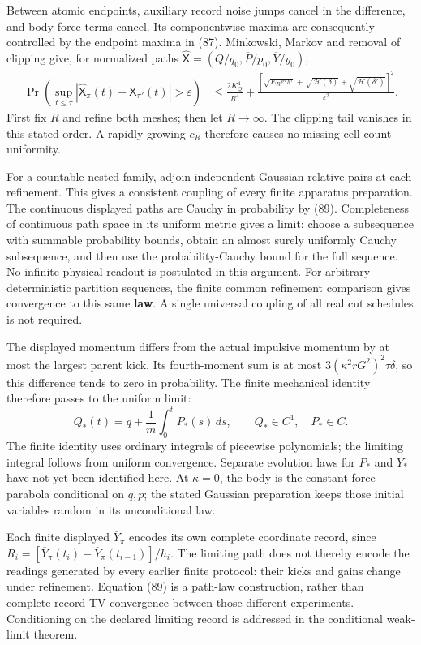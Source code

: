 \documentclass[11pt,a4paper]{article}
\begin{document}
Between atomic endpoints, auxiliary record noise jumps cancel in the
difference, and body force terms cancel. Its componentwise maxima are
consequently controlled by the endpoint maxima in (87). Minkowski,
Markov and removal of clipping give, for normalized paths
\(\widehat{\mathsf X}=(Q/q_0,\overline P/p_0,\overline Y/y_0)\),
\[\begin{aligned}
\Pr\left(\sup_{t\le\tau}
 |\widehat{\mathsf X}_\pi(t)-\widehat{\mathsf X}_{\pi'}(t)|
                    >\varepsilon\right)
&\le\frac{2K_Q^4}{R^4}
 +\frac{\left[\sqrt{E_Re^{c_R\tau}}
       +\sqrt{\mathcal H(\delta)}
       +\sqrt{\mathcal H(\delta')}\right]^2}{\varepsilon^2}.
\end{aligned}\tag{89}\] First fix \(R\) and refine both meshes; then let
\(R\to\infty\). The clipping tail vanishes in this stated order. A
rapidly growing \(c_R\) therefore causes no missing cell-count
uniformity.

For a countable nested family, adjoin independent Gaussian relative
pairs at each refinement. This gives a consistent coupling of every
finite apparatus preparation. The continuous displayed paths are Cauchy
in probability by (89). Completeness of continuous path space in its
uniform metric gives a limit: choose a subsequence with summable
probability bounds, obtain an almost surely uniformly Cauchy
subsequence, and then use the probability-Cauchy bound for the full
sequence. No infinite physical readout is postulated in this argument.
For arbitrary deterministic partition sequences, the finite common
refinement comparison gives convergence to this same \textbf{law}. A
single universal coupling of all real cut schedules is not required.

The displayed momentum differs from the actual impulsive momentum by at
most the largest parent kick. Its fourth-moment sum is at most
\(3(\kappa^2rG^2)^2\tau\delta\), so this difference tends to zero in
probability. The finite mechanical identity therefore passes to the
uniform limit: \[Q_*(t)=q+\frac1m\int_0^tP_*(s)\,ds,
\qquad Q_*\in C^1,\quad P_*\in C.\tag{90}\] The finite identity uses
ordinary integrals of piecewise polynomials; the limiting integral
follows from uniform convergence. Separate evolution laws for \(P_*\)
and \(Y_*\) have not yet been identified here. At \(\kappa=0\), the body
is the constant-force parabola conditional on \(q,p\); the stated
Gaussian preparation keeps those initial variables random in its
unconditional law.

Each finite displayed \(\overline Y_\pi\) encodes its own complete
coordinate record, since
\(R_i=[\overline Y_\pi(t_i)-\overline Y_\pi(t_{i-1})]/h_i\). The
limiting path does not thereby encode the readings generated by every
earlier finite protocol: their kicks and gains change under refinement.
Equation (89) is a path-law construction, rather than complete-record TV
convergence between those different experiments. Conditioning on the
declared limiting record is addressed in the conditional weak-limit
theorem.
\end{document}

